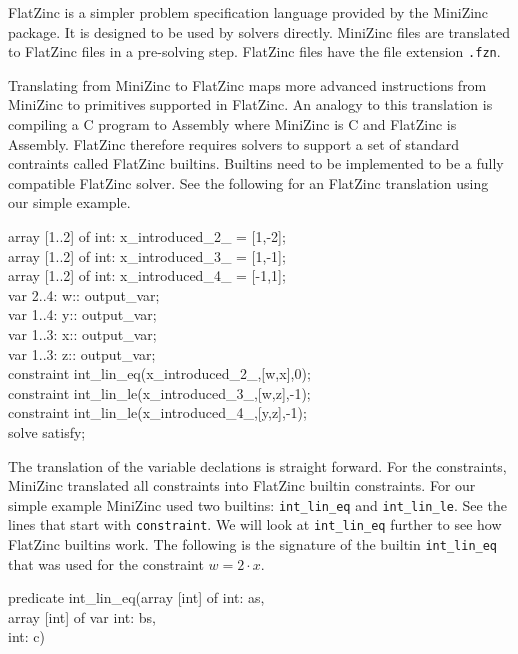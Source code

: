 FlatZinc is a simpler problem specification language provided by the MiniZinc package. It is designed to be used by solvers directly. MiniZinc files are translated to FlatZinc files in a pre-solving step. FlatZinc files have the file extension \verb|.fzn|.

Translating from MiniZinc to FlatZinc maps more advanced instructions from MiniZinc to primitives supported in FlatZinc. An analogy to this translation is compiling a C program to Assembly where MiniZinc is C and FlatZinc is Assembly. FlatZinc therefore requires solvers to support a set of standard contraints called FlatZinc builtins. Builtins need to be implemented to be a fully compatible FlatZinc solver. See the following for an FlatZinc translation using our simple example.

\begin{tcolorbox}[title=Simple example translated to FlatZinc (Simplified)]
	array [1..2] of int: x\_introduced\_2\_ = [1,-2]; \\
	array [1..2] of int: x\_introduced\_3\_ = [1,-1]; \\
	array [1..2] of int: x\_introduced\_4\_ = [-1,1]; \\
	var 2..4: w:: output\_var; \\
	var 1..4: y:: output\_var; \\
	var 1..3: x:: output\_var; \\
	var 1..3: z:: output\_var; \\
	constraint int\_lin\_eq(x\_introduced\_2\_,[w,x],0); \\
	constraint int\_lin\_le(x\_introduced\_3\_,[w,z],-1); \\
	constraint int\_lin\_le(x\_introduced\_4\_,[y,z],-1); \\
	solve  satisfy;
\end{tcolorbox}

The translation of the variable declations is straight forward. For the constraints, MiniZinc translated all constraints into FlatZinc builtin constraints. For our simple example MiniZinc used two builtins: \verb|int_lin_eq| and \verb|int_lin_le|. See the lines that start with \verb|constraint|. We will look at \verb|int_lin_eq| further to see how FlatZinc builtins work. The following is the signature of the builtin \verb|int_lin_eq| that was used for the constraint $w = 2 \cdot x$.

\begin{tcolorbox}[title=int\_lin\_eq builtin signature]
	predicate int\_lin\_eq(array [int] of int: as,\\
	array [int] of var int: bs,\\
	int: c)
\end{tcolorbox}

